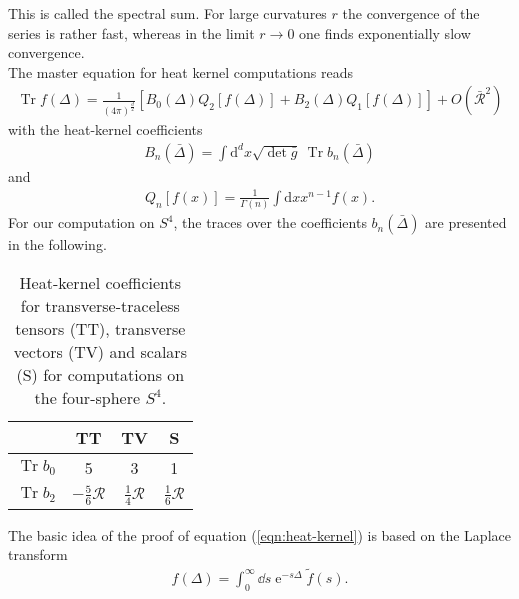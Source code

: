 This is called the spectral sum. For large curvatures $r$ the convergence of the series is rather fast, whereas in the limit $r\rightarrow 0$ one finds exponentially slow convergence.\\
The master equation for heat kernel computations reads
\begin{align}
	\operatorname{Tr} f(\Delta)=\frac{1}{(4 \pi)^{\frac{d}{2}}}\left[B_{0}(\Delta) Q_{2}[f(\Delta)]+B_{2}(\Delta) Q_{1}[f(\Delta)]\right]+O\left(\bar{\mathcal{R}}^{2}\right)
\end{align}
with the heat-kernel coefficients 
\begin{align}
	B_{n}(\bar{\Delta})=\int \mathrm{d}^{d} x \sqrt{\operatorname{det}\bar{g}} \  \operatorname{Tr} b_{n}(\bar{\Delta})
\end{align}
and 
\begin{align}
	Q_{n}[f(x)]=\frac{1}{\Gamma(n)} \int \mathrm{d} x x^{n-1} f(x).
\end{align}
For our computation on $S^4$, the traces over the coefficients $b_n(\bar{\Delta})$ are presented in the following.
\begin{table}[H]
	\centering
	\setlength{\tabcolsep}{5mm}
	\setlength\extrarowheight{2mm}
	\begin{tabular}{c | c c c}
	   & TT & TV & S\\ \hline
	   $\operatorname{Tr} b_{0}$ & 5 &  3 & 1\\
	  $\operatorname{Tr} b_{2}$ & $-\frac{5}{6}\mathcal{R}$ & $\frac{1}{4}\mathcal{R}$& $\frac{1}{6}\mathcal{R}$\\
	\end{tabular}
	\caption{Heat-kernel coefficients for transverse-traceless tensors (TT), transverse vectors (TV) and scalars (S) for computations on the four-sphere $S^4$.}
\end{table}

The basic idea of the proof of equation (\ref{eqn:heat-kernel}) is based on the Laplace transform
\begin{align}
	f(\Delta) = \int_0^{\infty} \dd s \operatorname{e}^{-s\Delta}\tilde{f}(s).
\end{align}


